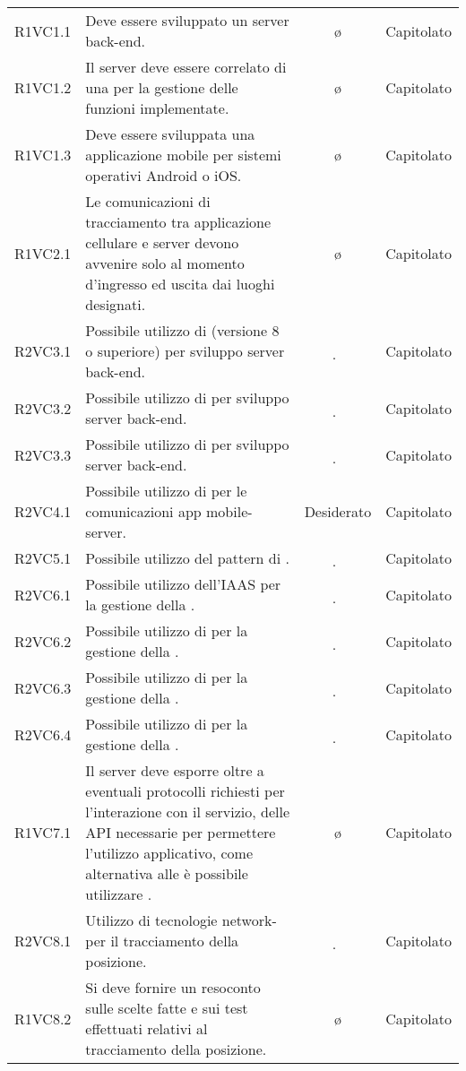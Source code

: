 {\begin{longtable}{ c C{6.5cm} c c}
R1VC1.1 & Deve essere sviluppato un server back-end. & \o & Capitolato \\
R1VC1.2 & Il server deve essere correlato di una  per la gestione delle funzioni implementate. & \o & Capitolato \\
R1VC1.3 & Deve essere sviluppata una applicazione mobile per sistemi operativi Android o iOS. & \o & Capitolato \\
R1VC2.1 & Le comunicazioni di tracciamento tra applicazione cellulare e server devono avvenire solo al momento d’ingresso ed uscita dai luoghi designati. & \o & Capitolato \\
R2VC3.1 & Possibile utilizzo di  (versione 8 o superiore) per sviluppo server back-end. & \d & Capitolato \\
R2VC3.2 & Possibile utilizzo di  per sviluppo server back-end. & \d & Capitolato \\
R2VC3.3 & Possibile utilizzo di  per sviluppo server back-end. & \d & Capitolato \\
R2VC4.1 & Possibile utilizzo di  per le comunicazioni app mobile-server. & Desiderato & Capitolato \\
R2VC5.1 & Possibile utilizzo del pattern di . & \d & Capitolato \\
R2VC6.1 & Possibile utilizzo dell’IAAS  per la gestione della . & \d & Capitolato \\
R2VC6.2 & Possibile utilizzo di  per la gestione della . & \d & Capitolato \\
R2VC6.3 & Possibile utilizzo di  per la gestione della . & \d & Capitolato \\
R2VC6.4 & Possibile utilizzo di  per la gestione della . & \d & Capitolato \\
R1VC7.1 & Il server deve esporre oltre a eventuali protocolli richiesti per l’interazione con il servizio, delle API  necessarie per permettere l’utilizzo applicativo, come alternativa alle   è possibile utilizzare . & \o & Capitolato \\
R2VC8.1 & Utilizzo di tecnologie network- per il tracciamento della posizione. & \d & Capitolato \\
R1VC8.2 & Si deve fornire un resoconto sulle scelte fatte e sui test effettuati relativi al tracciamento della posizione. & \o & Capitolato \\

\end{longtable}}
